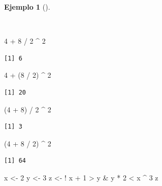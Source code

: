 \documentclass[
  a4paper,
]{scrreport}
\newenvironment{Shaded}{\begin{snugshade}}{\end{snugshade}}
\newcommand{\DecValTok}[1]{\textcolor[rgb]{0.68,0.00,0.00}{#1}}
\newcommand{\NormalTok}[1]{\textcolor[rgb]{0.00,0.23,0.31}{#1}}
\newcommand{\OtherTok}[1]{\textcolor[rgb]{0.00,0.23,0.31}{#1}}
\newcommand{\SpecialCharTok}[1]{\textcolor[rgb]{0.37,0.37,0.37}{#1}}
\theoremstyle{definition}
\theoremstyle{definition}
\newtheorem{example}{Ejemplo}[chapter]
\theoremstyle{remark}
\begin{document}
\begin{example}[]\protect\hypertarget{exm-prioridad-evaluacion}{}\label{exm-prioridad-evaluacion}

~

\begin{Shaded}
\begin{Highlighting}[]
\DecValTok{4} \SpecialCharTok{+} \DecValTok{8} \SpecialCharTok{/} \DecValTok{2} \SpecialCharTok{\^{}} \DecValTok{2}
\end{Highlighting}
\end{Shaded}

\begin{verbatim}
[1] 6
\end{verbatim}

\begin{Shaded}
\begin{Highlighting}[]
\DecValTok{4} \SpecialCharTok{+}\NormalTok{ (}\DecValTok{8} \SpecialCharTok{/} \DecValTok{2}\NormalTok{) }\SpecialCharTok{\^{}} \DecValTok{2}
\end{Highlighting}
\end{Shaded}

\begin{verbatim}
[1] 20
\end{verbatim}

\begin{Shaded}
\begin{Highlighting}[]
\NormalTok{(}\DecValTok{4} \SpecialCharTok{+} \DecValTok{8}\NormalTok{) }\SpecialCharTok{/} \DecValTok{2} \SpecialCharTok{\^{}} \DecValTok{2}
\end{Highlighting}
\end{Shaded}

\begin{verbatim}
[1] 3
\end{verbatim}

\begin{Shaded}
\begin{Highlighting}[]
\NormalTok{(}\DecValTok{4} \SpecialCharTok{+} \DecValTok{8} \SpecialCharTok{/} \DecValTok{2}\NormalTok{) }\SpecialCharTok{\^{}} \DecValTok{2}
\end{Highlighting}
\end{Shaded}

\begin{verbatim}
[1] 64
\end{verbatim}

\begin{Shaded}
\begin{Highlighting}[]
\NormalTok{x }\OtherTok{\textless{}{-}} \DecValTok{2} 
\NormalTok{y }\OtherTok{\textless{}{-}} \DecValTok{3}
\NormalTok{z }\OtherTok{\textless{}{-}} \SpecialCharTok{!}\NormalTok{ x }\SpecialCharTok{+} \DecValTok{1} \SpecialCharTok{\textgreater{}}\NormalTok{ y }\SpecialCharTok{\&}\NormalTok{ y }\SpecialCharTok{*} \DecValTok{2}  \SpecialCharTok{\textless{}}\NormalTok{ x }\SpecialCharTok{\^{}} \DecValTok{3}
\NormalTok{z}
\end{Highlighting}
\end{Shaded}


\end{example}
\end{document}
